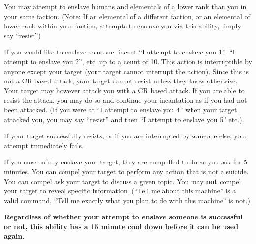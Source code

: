 \documentclass[green]{elementals}
\begin{document}
\name{\gEnslave{}} 

You may attempt to enslave humans and elementals of a lower rank than you in your same faction. (Note: If an elemental of a different faction, or an elemental of lower rank within your faction, attempts to enslave you via this ability, simply say ``resist'')

If you would like to enslave someone, incant ``I attempt to enslave you 1'', ``I attempt to enslave you 2'', etc. up to a count of 10. This action is interruptible by anyone except your target (your target cannot interrupt the action). Since this is not a CR based attack, your target cannot resist unless they know otherwise. Your target may however attack you with a CR based attack. If you are able to resist the attack, you may do so and continue your incantation as if you had not been attacked. (If you were at ``I attempt to enslave you 4'' when your target attacked you, you may say ``resist'' and then ``I attempt to enslave you 5'' etc.).

If your target successfully resists, or if you are interrupted by someone else, your attempt immediately fails.

If you successfully enslave your target, they are compelled to do as you ask for 5 minutes. You can compel your target to perform any action that is not a suicide. You can compel ask your target to discuss a given topic. You may {\bf not} compel your target to reveal specific information. (``Tell me about this machine'' is a valid command, ``Tell me exactly what you plan to do with this machine'' is not.)

{\bf Regardless of whether your attempt to enslave someone is successful or not, this ability has a 15 minute cool down before it can be used again.}
\end{document}
